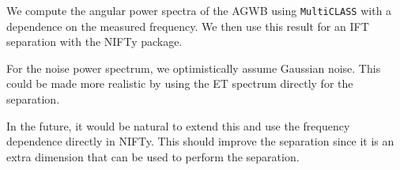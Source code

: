We compute the angular power spectra of the AGWB using {\tt MultiCLASS} with a dependence on the measured frequency. We then use this result for an IFT separation with the NIFTy package. 

For the noise power spectrum, we optimistically assume Gaussian noise. This could be made more realistic by using the ET spectrum directly for the separation. 

In the future, it would be natural to extend this and use the frequency dependence directly in NIFTy. This should improve the separation since it is an extra dimension that can be used to perform the separation.
